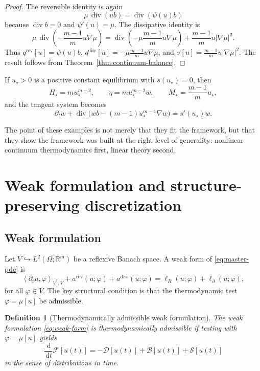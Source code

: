 \documentclass[11pt]{article}
\newtheorem{definition}[theorem]{Definition}
\newcommand{\R}{\mathbb{R}}
\newcommand{\Om}{\Omega}
\newcommand{\grad}{\nabla}
\newcommand{\diver}{\operatorname{div}}
\newcommand{\dd}{\,\mathrm{d}}
\newcommand{\F}{\mathcal{F}}
\newcommand{\Diss}{\mathcal{D}}
\newcommand{\Bnd}{\mathcal{B}}
\newcommand{\Src}{\mathcal{S}}
\newcommand{\pair}[2]{\left\langle #1,#2\right\rangle}
\begin{document}
\begin{proof}
The reversible identity is again
\[
\mu\,\diver(ub)=\diver(\psi(u)b)
\]
because \(\diver b=0\) and \(\psi'(u)=\mu\). The dissipative identity is
\[
\mu\,\diver\!\left(-\frac{m-1}{m}u\grad \mu\right)
=
\diver\!\left(-\mu\frac{m-1}{m}u\grad \mu\right)
+\frac{m-1}{m}u|\grad \mu|^2.
\]
Thus \(q^{\mathrm{rev}}[u]=\psi(u)b\),
\(q^{\mathrm{diss}}[u]=-\mu\frac{m-1}{m}u\grad \mu\), and
\(\sigma[u]=\frac{m-1}{m}u|\grad \mu|^2\). The result follows from
Theorem~\ref{thm:continuum-balance}.
\end{proof}

If \(u_\star>0\) is a positive constant equilibrium with \(s(u_\star)=0\), then
\[
H_\star=mu_\star^{m-2},
\qquad
\eta=mu_\star^{m-2}w,
\qquad
M_\star=\frac{m-1}{m}u_\star,
\]
and the tangent system becomes
\[
\partial_t w + \diver\bigl(wb-(m-1)u_\star^{m-1}\grad w\bigr)=s'(u_\star)w.
\]

The point of these examples is not merely that they fit the framework, but that they
show the framework was built at the right level of generality: nonlinear continuum
thermodynamics first, linear theory second.

\section{Weak formulation and structure-preserving discretization}

\subsection{Weak formulation}

Let \(V\hookrightarrow L^2(\Om;\R^m)\) be a reflexive Banach space. A weak form of
\eqref{eq:master-pde} is
\begin{equation}\label{eq:weak-form}
\pair{\partial_t u}{\varphi}_{V^\ast,V}
+
a^{\mathrm{rev}}(u;\varphi)
+
a^{\mathrm{diss}}(u;\varphi)
=
\ell_R(u;\varphi)+\ell_\partial(u;\varphi),
\end{equation}
for all \(\varphi\in V\). The key structural condition is that the thermodynamic test
\(\varphi=\mu[u]\) be admissible.

\begin{definition}[Thermodynamically admissible weak formulation]
The weak formulation \eqref{eq:weak-form} is \emph{thermodynamically admissible} if
testing with \(\varphi=\mu[u]\) yields
\begin{equation}\label{eq:weak-balance}
\frac{\dd}{\dd t}\F[u(t)]
=
-\Diss[u(t)] + \Bnd[u(t)] + \Src[u(t)]
\end{equation}
in the sense of distributions in time.
\end{definition}
\end{document}
